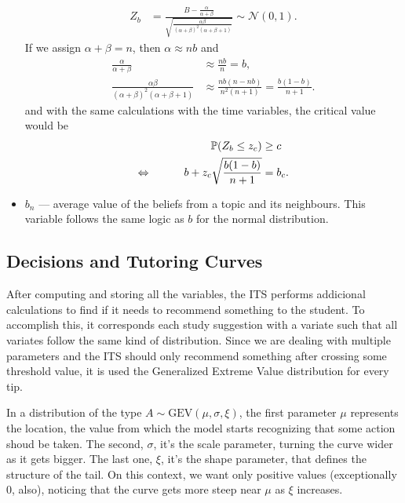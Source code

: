 \documentclass{article}
\newcommand{\0}{\mathbbold{0}}
\newcommand{\1}{\mathds{1}}
\newcommand{\LRA}{\Leftrightarrow\mkern40mu}
\newcommand{\GEV}[3]{\text{GEV}\!\left(#1,#2,#3\right)}
\begin{document}
\begin{itemize}
\begin{align*}
        Z_b &= \frac{B - \frac{\alpha}{\alpha + \beta}}{\sqrt{\frac{\alpha\beta}{(\alpha+\beta)^2(\alpha+\beta+1)}}} \sim \mathcal{N}(0,1).
    \end{align*}
    If we assign $\alpha + \beta = n$, then $\alpha \approx nb$ and
    \begin{align*}
        \frac{\alpha}{\alpha+\beta} &\approx \frac{nb}{n} = b, \\
        \frac{\alpha\beta}{(\alpha+\beta)^2(\alpha+\beta+1)} &\approx \frac{nb(n-nb)}{n^2(n+1)} = \frac{b(1-b)}{n+1}.
    \end{align*}
    and with the same calculations with the time variables, the critical value would be
    \begin{alignat*}{2}
        && \mathbb{P}(Z_b \le z_c) &\ge c \\
        \LRA && b + z_c\sqrt{\frac{b(1-b)}{n+1}} &= b_c.
    \end{alignat*}
    \item $b_n$ — average value of the beliefs from a topic and its neighbours. This variable follows the same logic as $b$ for the normal distribution.
\end{itemize}

\subsection{Decisions and Tutoring Curves}
After computing and storing all the variables, the ITS performs addicional calculations to find if it needs to recommend something to the student. 
To accomplish this, it corresponds each study suggestion with a variate such that all variates follow the same kind of distribution.
Since we are dealing with multiple parameters and the ITS should only recommend something after crossing some threshold value, it is used the Generalized Extreme Value distribution for every tip.

In a distribution of the type $A \sim \GEV{\mu}{\sigma}{\xi}$, the first parameter $\mu$ represents the location, the value from which the model starts recognizing that some action shoud be taken.
The second, $\sigma$, it's the scale parameter, turning the curve wider as it gets bigger. The last one, $\xi$, it's the shape parameter, that defines the structure of the tail. On this context, we want only positive values (exceptionally 0, also), noticing that the curve gets more steep near $\mu$ as $\xi$ increases.
\end{document}
